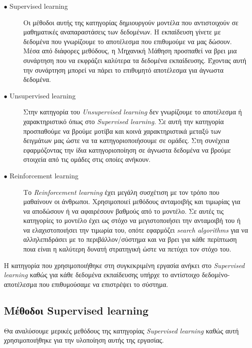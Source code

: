 \begin{description}

\item[$\bullet$ Supervised learning] Οι μέθοδοι αυτής της κατηγορίας δημιουργούν μοντέλα που αντιστοιχούν σε μαθηματικές αναπαραστάσεις των δεδομένων. Η εκπαίδευση γίνετε με δεδομένα που γνωρίζουμε το αποτέλεσμα που επιθυμούμε να μας δώσουν. Μέσα από διάφορες μεθόδους, η Μηχανική Μάθηση προσπαθεί να βρει μια συνάρτηση που να εκφράζει καλύτερα τα δεδομένα εκπαίδευσης. Έχοντας αυτή την συνάρτηση μπορεί να πάρει το επιθυμητό αποτέλεσμα για άγνωστα δεδομένα.

\item[$\bullet$ Unsupervised learning] Στην κατηγορία του \textit{Unsupervised learning} δεν γνωρίζουμε το αποτέλεσμα ή χαρακτηριστικό όπως στο \textit{Supervised learning}. Σε αυτή την κατηγορία προσπαθούμε να βρούμε μοτίβα και κοινά χαρακτηριστικά μεταξύ των δειγμάτων μας ώστε να τα κατηγοριοποιήσουμε σε ομάδες. Στη συνέχεια εφαρμόζοντας την ίδια κατηγοριοποίηση σε άγνωστα δεδομένα να βρούμε στοιχεία από τις ομάδες στις οποίες ανήκουν.

\item[$\bullet$ Reinforcement learning] Το \textit{Reinforcement learning} έχει μεγάλη συσχέτιση με τον τρόπο που μαθαίνουν οι άνθρωποι. Χρησιμοποιεί μεθόδους ανταμοιβής και τιμωρίας για να αποδώσουν ή να αφαιρέσουν βαθμούς από το μοντέλο. Σε αυτές τις κατηγορίες το μοντέλο έχει ως στόχο να μεγιστοποιήσει την ανταμοιβή του ή να ελαχιστοποιήσει την τιμωρία του, οπότε εφαρμόζει \textit{search algorithms} για να αλληλεπιδράσει με το περιβάλλον/σύστημα και να βρει για κάθε περίπτωση ποια είναι η καλύτερη δυνατή στρατηγική ώστε να πετύχει τον στόχο του.

\end{description}

Η κατηγορία που χρησιμοποιήθηκε στη συγκεκριμένη εργασία ανήκει στο \textit{Supervised learning} καθώς για κάθε δεδομένα εκπαίδευσης υπήρχε το αντίστοιχο δεδομένο-αποτέλεσμα που επιθυμούσαμε να επιστρέψει το σύστημα.

\subsection{Μέθοδοι Supervised learning}
Θα αναλύσουμε μερικές μεθόδους της κατηγορίας \textit{Supervised learning} καθώς αυτή χρησιμοποιήθηκε για την υλοποίηση αυτής της εργασίας.


